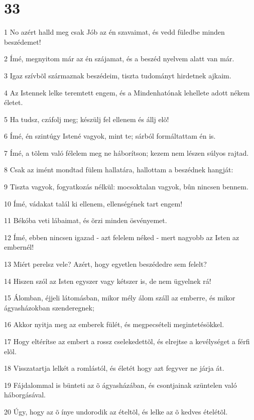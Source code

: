 \chapter{33}

\par 1 No azért halld meg csak Jób az én szavaimat, és vedd füledbe minden beszédemet!
\par 2 Ímé, megnyitom már az én szájamat, és a beszéd nyelvem alatt van már.
\par 3 Igaz szívbõl származnak beszédeim, tiszta tudományt hirdetnek ajkaim.
\par 4 Az Istennek lelke teremtett engem, és a Mindenhatónak lehellete adott nékem életet.
\par 5 Ha tudsz, czáfolj meg; készülj fel ellenem és állj elõ!
\par 6 Ímé, én szintúgy Istené vagyok, mint te; sárból formáltattam én is.
\par 7 Ímé, a tõlem való félelem meg ne háborítson; kezem nem lészen súlyos rajtad.
\par 8 Csak az imént mondtad fülem hallatára, hallottam a beszédnek hangját:
\par 9 Tiszta vagyok, fogyatkozás nélkül: mocsoktalan vagyok, bûn nincsen bennem.
\par 10 Ímé, vádakat talál ki ellenem, ellenségének tart engem!
\par 11 Békóba veti lábaimat, és õrzi minden ösvényemet.
\par 12 Ímé, ebben nincsen igazad - azt felelem néked - mert nagyobb az Isten az embernél!
\par 13 Miért perelsz vele? Azért, hogy egyetlen beszédedre sem felelt?
\par 14 Hiszen szól az Isten egyszer vagy kétszer is, de nem ügyelnek rá!
\par 15 Álomban, éjjeli látomásban, mikor mély álom száll az emberre, és mikor ágyasházokban szenderegnek;
\par 16 Akkor nyitja meg az emberek fülét, és megpecsételi megintetésökkel.
\par 17 Hogy eltérítse az embert a rossz cselekedettõl, és elrejtse a kevélységet a férfi elõl.
\par 18 Visszatartja lelkét a romlástól, és életét hogy azt fegyver ne járja át.
\par 19 Fájdalommal is bünteti az õ ágyasházában, és csontjainak szüntelen való háborgásával.
\par 20 Úgy, hogy az õ ínye undorodik az ételtõl, és lelke az õ kedves ételétõl.
